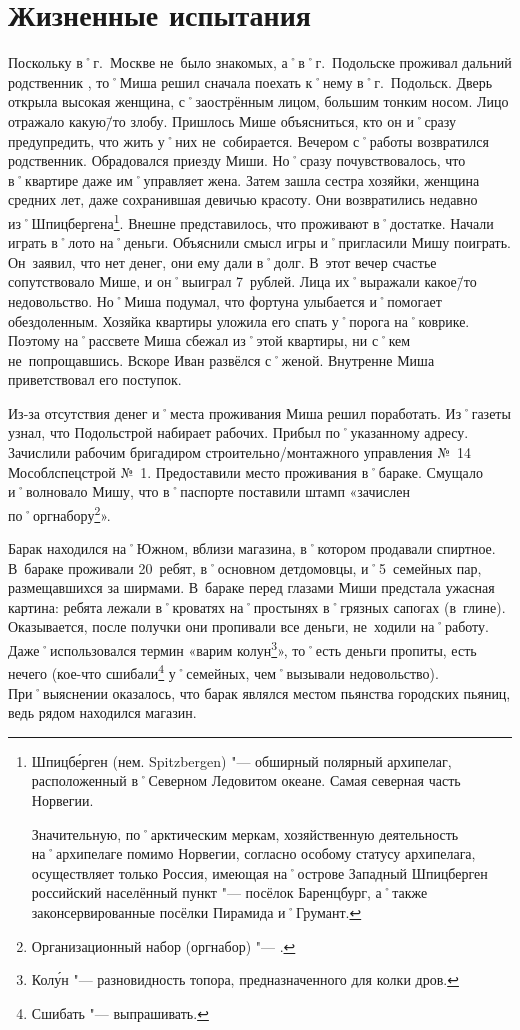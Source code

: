 ﻿\chapter{Жизненные испытания}

Поскольку в˚г.~Москве не~было знакомых, а˚в˚г.~Подольске проживал дальний родственник , то˚Миша решил сначала поехать к˚нему в˚г.~Подольск. Дверь открыла высокая женщина, с˚заострённым лицом, большим тонким носом. Лицо отражало какую\=/то злобу. Пришлось Мише объясниться, кто он и˚сразу предупредить, что жить у˚них не~собирается. Вечером с˚работы возвратился родственник. Обрадовался приезду Миши. Но˚сразу почувствовалось, что в˚квартире даже им˚управляет жена. Затем зашла сестра хозяйки,  женщина средних лет, даже сохранившая девичью красоту. Они возвратились недавно из˚Шпицбергена\footnote{Шпицб\'{е}рген (нем. Spitzbergen) "--- обширный полярный архипелаг, расположенный в˚Северном Ледовитом океане. Самая северная часть Норвегии. 

Значительную, по˚арктическим меркам, хозяйственную деятельность на˚архипелаге помимо Норвегии, согласно особому статусу архипелага, осуществляет только Россия, имеющая на˚острове Западный Шпицберген российский населённый пункт "--- посёлок Баренцбург, а˚также законсервированные посёлки Пирамида и˚Грумант.}. 
Внешне представилось, что проживают в˚достатке. Начали играть в˚лото на˚деньги. Объяснили смысл игры и˚пригласили Мишу поиграть. Он~заявил, что нет денег, они ему дали в˚долг. В~этот вечер счастье сопутствовало Мише, и он˚выиграл 7~рублей. Лица их˚выражали какое\=/то недовольство. Но˚Миша подумал, что фортуна улыбается и˚помогает обездоленным. Хозяйка квартиры уложила его спать у˚порога на˚коврике. Поэтому на˚рассвете Миша сбежал из˚этой квартиры, ни с˚кем не~попрощавшись. Вскоре Иван развёлся с˚женой. Внутренне Миша приветствовал его поступок.

Из-за отсутствия денег и˚места проживания Миша решил поработать. Из˚газеты узнал, что Подольстрой набирает рабочих. Прибыл по˚указанному адресу. Зачислили рабочим бригадиром строительно\-/монтажного управления №~14 Мособлспецстрой №~1. Предоставили место проживания в˚бараке. Смущало и˚волновало Мишу, что в˚паспорте поставили штамп «зачислен по˚оргнабору\footnote{Организационный набор (оргнабор) "--- .}». 

Барак находился на˚Южном, вблизи магазина, в˚котором продавали спиртное. В~бараке проживали 20~ребят, в˚основном детдомовцы, и˚5~семейных пар, размещавшихся за ширмами. В~бараке перед глазами Миши предстала ужасная картина: ребята лежали в˚кроватях на˚простынях в˚грязных сапогах (в~глине). Оказывается, после получки они пропивали все деньги, не~ходили на˚работу. Даже˚использовался термин «варим колун\footnote{Кол\'{у}н "--- разновидность топора, предназначенного для колки дров.}», то˚есть деньги пропиты, есть нечего (кое-что сшибали\footnote{Сшибать "--- выпрашивать.} у˚семейных, чем˚вызывали недовольство). При˚выяснении оказалось, что барак являлся местом пьянства городских пьяниц, ведь рядом находился магазин. 

